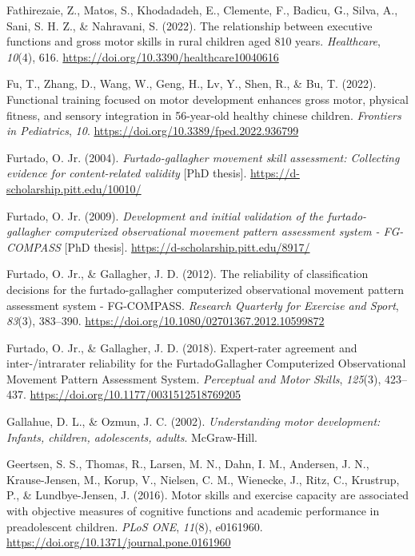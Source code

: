 \documentclass[
  letterpaper,
  DIV=11,
  numbers=noendperiod]{scrreprt}
\newlength{\cslhangindent}
\newenvironment{CSLReferences}[2] %
 {\begin{list}{}{%
  \setlength{\itemindent}{0pt}
  \setlength{\leftmargin}{0pt}
  \setlength{\parsep}{0pt}
  \ifodd #1
   \setlength{\leftmargin}{\cslhangindent}
   \setlength{\itemindent}{-1\cslhangindent}
  \fi
  \setlength{\itemsep}{#2\baselineskip}}}
 {\end{list}}
\begin{document}
\begin{CSLReferences}{1}{0}
Fathirezaie, Z., Matos, S., Khodadadeh, E., Clemente, F., Badicu, G.,
Silva, A., Sani, S. H. Z., \& Nahravani, S. (2022). The relationship
between executive functions and gross motor skills in rural children
aged 8{\textendash}10 years. \emph{Healthcare}, \emph{10}(4), 616.
\url{https://doi.org/10.3390/healthcare10040616}

Fu, T., Zhang, D., Wang, W., Geng, H., Lv, Y., Shen, R., \& Bu, T.
(2022). Functional training focused on motor development enhances gross
motor, physical fitness, and sensory integration in
5{\textendash}6-year-old healthy chinese children. \emph{Frontiers in
Pediatrics}, \emph{10}. \url{https://doi.org/10.3389/fped.2022.936799}

Furtado, O. Jr. (2004). \emph{Furtado-gallagher movement skill
assessment: Collecting evidence for content-related validity} {[}PhD
thesis{]}. \url{https://d-scholarship.pitt.edu/10010/}

Furtado, O. Jr. (2009). \emph{Development and initial validation of the
furtado-gallagher computerized observational movement pattern assessment
system - FG-COMPASS} {[}PhD thesis{]}.
\url{https://d-scholarship.pitt.edu/8917/}

Furtado, O. Jr., \& Gallagher, J. D. (2012). The reliability of
classification decisions for the furtado-gallagher computerized
observational movement pattern assessment system - FG-COMPASS.
\emph{Research Quarterly for Exercise and Sport}, \emph{83}(3),
383--390. \url{https://doi.org/10.1080/02701367.2012.10599872}

Furtado, O. Jr., \& Gallagher, J. D. (2018). Expert-rater agreement and
inter-/intrarater reliability for the Furtado{\textendash}Gallagher
Computerized Observational Movement Pattern Assessment System.
\emph{Perceptual and Motor Skills}, \emph{125}(3), 423--437.
\url{https://doi.org/10.1177/0031512518769205}

Gallahue, D. L., \& Ozmun, J. C. (2002). \emph{Understanding motor
development: Infants, children, adolescents, adults}. McGraw-Hill.

Geertsen, S. S., Thomas, R., Larsen, M. N., Dahn, I. M., Andersen, J.
N., Krause-Jensen, M., Korup, V., Nielsen, C. M., Wienecke, J., Ritz,
C., Krustrup, P., \& Lundbye-Jensen, J. (2016). Motor skills and
exercise capacity are associated with objective measures of cognitive
functions and academic performance in preadolescent children. \emph{PLoS
ONE}, \emph{11}(8), e0161960.
\url{https://doi.org/10.1371/journal.pone.0161960}


\end{CSLReferences}
\end{document}
